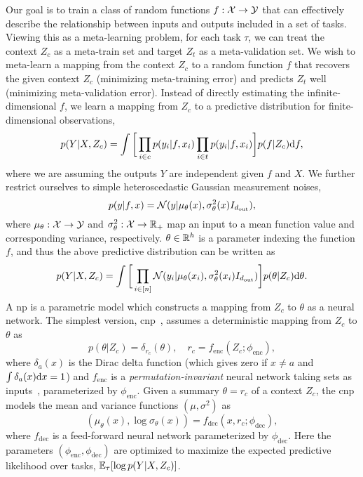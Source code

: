 Our goal is to train a class of random functions $f: {\mathcal{X}} \to {\mathcal{Y}}$ that can effectively describe the relationship between inputs and outputs included in a set of tasks. Viewing this as a meta-learning problem, for each task $\tau$, we can treat the context $Z_c$ as a meta-train set and target $Z_t$ as a meta-validation set. We wish to meta-learn a mapping from the context $Z_c$ to a random function $f$ that recovers the given context $Z_c$ (minimizing meta-training error) and predicts $Z_t$ well (minimizing meta-validation error). Instead of directly estimating the infinite-dimensional $f$, we learn a mapping from $Z_c$ to a predictive distribution for finite-dimensional observations,
\[
p(Y | X, Z_c) = \int \bigg[\prod_{i\in c} p(y_i | f, x_i) \prod_{i\in t} p(y_i | f, x_i)\bigg] p(f|Z_c) \mathrm{d} f,
\]
where we are assuming the outputs $Y$ are independent given $f$ and $X$. We further restrict ourselves to simple heteroscedastic Gaussian measurement noises,
\[
p(y|f, x) = {\mathcal{N}}(y | \mu_\theta(x), \sigma^2_\theta(x)I_{{d_{\text{out}}}}),
\]
where $\mu_\theta: {\mathcal{X}} \to {\mathcal{Y}}$ and $\sigma_\theta^2: {\mathcal{X}} \to \mathbb{R}_+$ map an input to a mean function value and corresponding variance, respectively. $\theta \in \mathbb{R}^{h}$ is a parameter indexing the function $f$, and thus the above predictive distribution can be written as
\[
p(Y | X, Z_c) = \int 
\bigg[\prod_{i\in [n]} {\mathcal{N}}(y_i|\mu_\theta(x_i), \sigma_\theta^2(x_i) I_{d_{\text{out}}})\bigg] p(\theta|Z_c) \mathrm{d} \theta.
\]
A \gls{np} is a parametric model which constructs a mapping from $Z_c$ to $\theta$ as a neural network. The simplest version, \gls{cnp}~\citep{garnelo2018conditional}, assumes a deterministic mapping from $Z_c$ to $\theta$ as
\[
p(\theta|Z_c) = \delta_{r_c}(\theta), \quad r_c = f_\text{enc}(Z_c ; \phi_\text{enc}),
\]
where $\delta_{a}(x)$ is the Dirac delta function (which gives zero if $x\neq a$ and $\int\delta_a(x) \mathrm{d} x=1$) and $f_\text{enc}$ is a \emph{permutation-invariant} neural network taking sets as inputs~\citep{zaheer2017deep}, parameterized by $\phi_\text{enc}$. Given a summary $\theta= r_c$ of a context $Z_c$, the \gls{cnp} models the mean and variance functions $(\mu, \sigma^2)$ as
\[
(\mu_\theta(x), \log \sigma_\theta(x)) = f_\text{dec}(x, r_c ; \phi_\text{dec}),
\]
where $f_\text{dec}$ is a feed-forward neural network parameterized by $\phi_\text{dec}$. Here the parameters $(\phi_\text{enc}, \phi_\text{dec})$ are optimized to maximize the expected predictive likelihood over tasks, $\mathbb{E}_{\tau}[\log p(Y|X, Z_c)]$.

